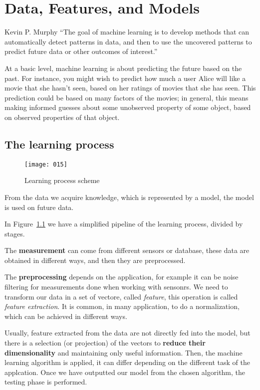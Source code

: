 \chapter{Data, Features, and Models}
\begin{chapquote}{Kevin P. Murphy}
    ``The goal of machine learning is to develop methods that can automatically detect patterns in data, and then to use the uncovered patterns to predict future data or other outcomes of interest.''
\end{chapquote}

At a basic level, machine learning is about predicting the future based on the past. For instance, you might wish to predict how much a user Alice will like a movie that she hasn't seen, based on her ratings of movies that she has seen. This prediction could be based on many factors of the movies; in general, this means making informed guesses about some unobserved property of some object, based on observed properties of that object.

\section{The learning process}

\begin{figure}[h]
\begin{center}
    \texttt{[image: 015]}
\end{center}
\caption{Learning process scheme}
\label{fig:015}
\end{figure}

From the data we acquire knowledge, which is represented by a model, the model is used on future data.

In Figure~\ref{fig:015} we have a simplified pipeline of the learning process, divided by stages. 

The \textbf{measurement} can come from different sensors or database, these data are obtained in different ways, and then they are preprocessed. 

The \textbf{preprocessing} depends on the application, for example it can be noise filtering for measurements done when working with sensonrs. We need to transform our data in a set of vectore, called \emph{feature}, this operation is called \emph{feature extraction}. It is common, in many application, to do a normalization, which can be achieved in different ways.

Usually, feature extracted from the data are not directly fed into the model, but there is a selection (or projection) of the vectors to \textbf{reduce their dimensionality} and maintaining only useful information. Then, the machine learning algorithm is applied, it can differ depending on the different task of the applcation. Once we have outputted our model from the chosen algorithm, the testing phase is performed.

